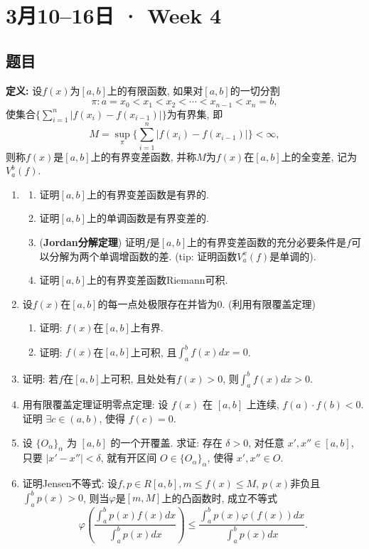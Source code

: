 \documentclass[UTF8,11pt, a4paper, oneside, fontset=none]{ctexbook}
\begin{document}
\clearpage

\section{3月10--16日 · Week 4}

\subsection*{题目}

\noindent
{\bf 定义:} 设$f(x)$为$[a, b]$上的有限函数, 如果对$[a, b]$的一切分割
\[
\pi: a = x_0  < x_1 < x_2 < \cdots < x_{n-1} < x_n =b,
\]
使集合$\{ \sum_{i=1}^n |f(x_i) - f(x_{i-1})| \}$为有界集, 即
\[
M = \sup_{\pi}\{ \sum_{i=1}^n |f(x_i) - f(x_{i-1})| \} < \infty,
\]
则称$f(x)$是$[a, b]$上的有界变差函数, 并称$M$为$f(x)$在$[a, b]$上的全变差, 记为$V_a^b(f)$.

\begin{enumerate}

\item
\begin{enumerate}
\item 证明$[a, b]$上的有界变差函数是有界的.
\item 证明$[a, b]$上的单调函数是有界变差的.
\item ({\bf Jordan分解定理}) 证明$f$是$[a, b]$上的有界变差函数的充分必要条件是$f$可以分解为两个单调增函数的差. (tip: 证明函数$V_a^x(f)$是单调的).
\item 证明$[a, b]$上的有界变差函数Riemann可积.
\end{enumerate}

\item 设$f(x)$在$[a, b]$的每一点处极限存在并皆为0. (利用有限覆盖定理)
\begin{enumerate}
\item 证明: $f(x)$在$[a, b]$上有界.
\item 证明: $f(x)$在$[a, b]$上可积, 且$\int_a^b f(x) dx = 0$.
 \end{enumerate}
\item 证明: 若$f$在$[a, b]$上可积, 且处处有$f(x) > 0$, 则$\int_a^b f(x) dx > 0$.
\item 用有限覆盖定理证明零点定理: 设 $f(x)$ 在 $[a,b]$ 上连续, $f(a) \cdot f(b) <0$. 证明 $\exists c \in (a,b)$, 使得 $f(c) = 0$.
\item 设 $\{O_{\alpha}\}_{\alpha}$ 为 $[a,b]$ 的一个开覆盖. 求证: 存在 $\delta>0$, 对任意 $x', x'' \in [a,b]$, 只要 $|x' - x''| < \delta$, 就有开区间 $O\in \{O_{\alpha}\}_{\alpha}$, 使得 $x', x'' \in O$.

\item 证明Jensen不等式: 设$f, p \in R[a, b], m \leq f(x) \leq M$, $p(x)$非负且$\int_a^b p(x) >0$, 则当$\varphi$是$[m, M]$上的凸函数时, 成立不等式
\[
\varphi \left( \frac{ \int_a^b p(x) f(x) dx}{\int_a^b p(x) dx} \right) \leq \frac{\int_a^b p(x) \varphi(f(x))dx}{\int_a^b p(x) dx}.
\]
\end{enumerate}
\end{document}
